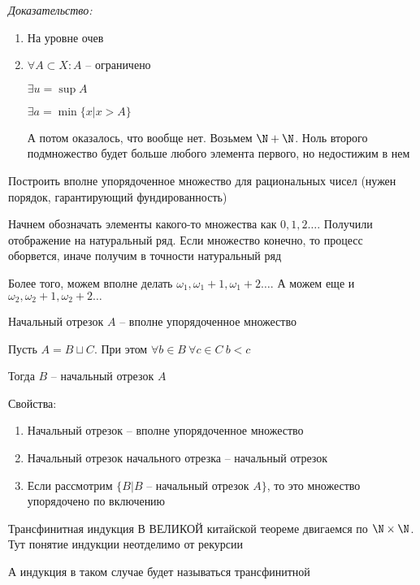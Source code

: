 \documentclass[12pt]{article}
\begin{document}
\textit{Доказательство:}

\begin{enumerate}
    \item На уровне очев 
    \item $\forall A \subset X : A$ -- ограничено 
    
    $\exists u = \sup A$

    $\exists a = \min \{ x | x > A \}$

    А потом оказалось, что вообще нет. Возьмем $\N + \N$. Ноль второго подмножество будет больше любого элемента первого, но недостижим в нем
\end{enumerate}

\begin{Exercise}{}
    Построить вполне упорядоченное множество для рациональных чисел (нужен порядок, гарантирующий фундированность)
\end{Exercise}

Начнем обозначать элементы какого-то множества как $0, 1, 2 \ldots$. Получили отображение на натуральный ряд. Если множество конечно, то процесс оборвется, иначе получим в точности натуральный ряд

Более того, можем вполне делать $\omega_1, \omega_1 + 1, \omega_1 + 2 \ldots$. А можем еще и $\omega_2, \omega_2 + 1, \omega_2 + 2 \ldots$

\begin{defin}{Начальный отрезок}
    $A$ -- вполне упорядоченное множество

    Пусть $A = B \sqcup C$. При этом $\forall b \in B\ \forall c \in C\ b < c$

    Тогда $B$ -- начальный отрезок $A$
\end{defin}

\begin{nota}{Свойства:}
    \begin{enumerate}
        \item Начальный отрезок -- вполне упорядоченное множество
        \item Начальный отрезок начального отрезка -- начальный отрезок
        \item Если рассмотрим $\{B | B \text{ -- начальный отрезок } A\}$, то это множество упорядочено по включению
    \end{enumerate}
\end{nota}

\begin{defin}{Трансфинитная индукция}
    В ВЕЛИКОЙ китайской теореме двигаемся по $\N \times \N$. Тут понятие индукции неотделимо от рекурсии

    А индукция в таком случае будет называться трансфинитной
\end{defin}
\end{document}
